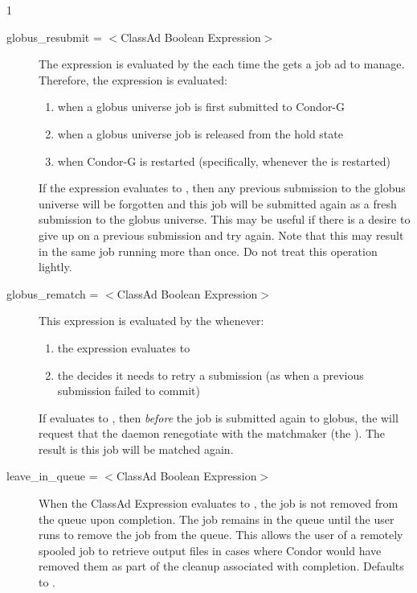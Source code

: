 \begin{ManPage}{\label{man-condor-submit}}{1}
\begin{description}

\item[globus\_resubmit = $<$ClassAd Boolean Expression$>$]
The expression is evaluated by the  each time
the  gets a job ad to manage.
Therefore, the expression is evaluated:
\begin{enumerate}
\item
   when a globus universe job is first submitted to Condor-G
\item
   when a globus universe job is released from the hold state
\item
   when Condor-G is restarted (specifically, whenever the 
   is restarted)
\end{enumerate}
If the expression evaluates to ,
then any previous submission to the globus universe will be
forgotten and this job will be submitted again as a fresh submission to
the globus universe.
This may be useful if there is a desire to give up on a
previous submission and try again.
Note that this may result in the same job running more than
once.  Do not treat this operation lightly.


\item[globus\_rematch = $<$ClassAd Boolean Expression$>$]
This expression is evaluated by the  whenever:
\begin{enumerate}
\item
   the  expression evaluates to 
\item
   the  decides it needs to retry a submission
   (as when a previous submission failed to commit)
\end{enumerate}
If  evaluates to ,
then \emph{before} the job is submitted again to globus,
the  will request that the 
daemon renegotiate
with the matchmaker (the ).
The result is this job will be matched again.


\item[leave\_in\_queue = $<$ClassAd Boolean Expression$>$] 
When the ClassAd Expression evaluates to , the job is
not removed from the queue upon completion.
The job remains in the queue until the user runs 
to remove the job from the queue.
This allows the user of a remotely spooled job to retrieve output
files in cases where Condor would have removed them as part of
the cleanup associated with completion.
Defaults to .


\end{description}
\end{ManPage}

